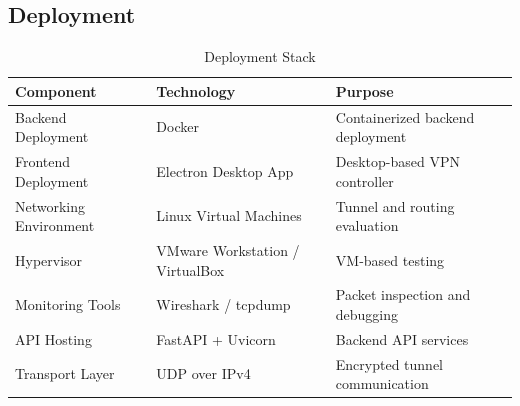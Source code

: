 \subsection{Deployment}

\begin{table}[H]
\centering
\begin{tabular}{|l|l|p{5cm}|}
\hline
\textbf{Component} & \textbf{Technology} & \textbf{Purpose} \\ \hline

Backend Deployment & Docker & Containerized backend deployment \\ \hline

Frontend Deployment & Electron Desktop App & Desktop-based VPN controller \\ \hline

Networking Environment & Linux Virtual Machines & Tunnel and routing evaluation \\ \hline

Hypervisor & VMware Workstation / VirtualBox & VM-based testing \\ \hline

Monitoring Tools & Wireshark / tcpdump & Packet inspection and debugging \\ \hline

API Hosting & FastAPI + Uvicorn & Backend API services \\ \hline

Transport Layer & UDP over IPv4 & Encrypted tunnel communication \\ \hline

\end{tabular}
\caption{Deployment Stack}
\end{table}